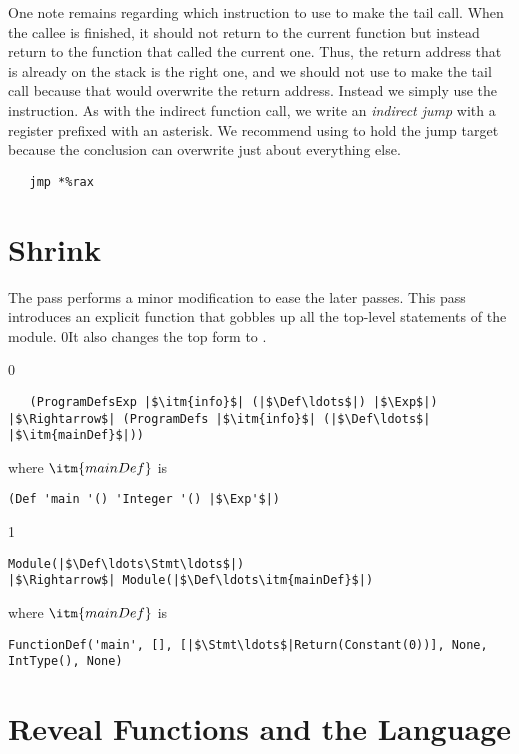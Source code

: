 \documentclass[7x10]{TimesAPriori_MIT}%
\def\racketEd{0}
\def\pythonEd{1}
\def\edition{1}
\newcommand{\racket}[1]{{\if\edition\racketEd{#1}\fi}}
\newcommand{\pythonColor}[0]{}
\numberwithin{theorem}{chapter}
\numberwithin{definition}{chapter}
\numberwithin{equation}{chapter}
\begin{document}
One note remains regarding which instruction to use to make the tail
call. When the callee is finished, it should not return to the current
function but instead return to the function that called the current
one. Thus, the return address that is already on the stack is the
right one, and we should not use  to make the tail call
because that would overwrite the return address. Instead we simply use
the  instruction. As with the indirect function call, we write
an \emph{indirect jump} with a register
prefixed with an asterisk.  We recommend using  to hold the
jump target because the conclusion can overwrite just about everything
else.
\begin{lstlisting}
   jmp *%rax
\end{lstlisting}


\section{Shrink \LangFun{}}
\label{sec:shrink-r4}

The  pass performs a minor modification to ease the
later passes. This pass introduces an explicit  function
that gobbles up all the top-level statements of the module.
%
\racket{It also changes the top  form to
\code{ProgramDefs}.}

{\if\edition\racketEd  
\begin{lstlisting}
   (ProgramDefsExp |$\itm{info}$| (|$\Def\ldots$|) |$\Exp$|)
|$\Rightarrow$| (ProgramDefs |$\itm{info}$| (|$\Def\ldots$| |$\itm{mainDef}$|))
\end{lstlisting}
where $\itm{mainDef}$ is
\begin{lstlisting}
(Def 'main '() 'Integer '() |$\Exp'$|)
\end{lstlisting}
\fi}
{\if\edition\pythonEd\pythonColor
\begin{lstlisting}
Module(|$\Def\ldots\Stmt\ldots$|)
|$\Rightarrow$| Module(|$\Def\ldots\itm{mainDef}$|)
\end{lstlisting}
where $\itm{mainDef}$ is
\begin{lstlisting}
FunctionDef('main', [], [|$\Stmt\ldots$|Return(Constant(0))], None, IntType(), None)
\end{lstlisting}
\fi}

\section{Reveal Functions and the \LangFunRef{} Language}
\label{sec:reveal-functions-r4}
\end{document}
